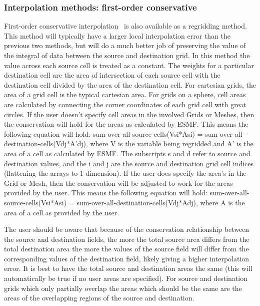 \subsubsection{Interpolation methods: first-order conservative}
 First-order conservative interpolation~\cite{ConservativeOrder1} is also available as a regridding method. This method 
 will typically have  
 a larger local interpolation error than the previous two methods, but will do a much better job of preserving the value
 of the  integral of data between the source and destination grid. In this method the value across each source cell
 is treated as a constant. The weights for a particular destination cell are the area of intersection of each 
 source cell with the destination cell divided by the area of the destination cell. For cartesian grids, the area of a grid cell is the typical cartesian area. 
 For grids on a sphere, cell areas are calculated by connecting the corner coordinates of each grid cell with great circles. If the user doesn't specify
 cell areas in the involved Grids or Meshes, then the conservation will hold for the areas as calculated by 
 ESMF. This means the following equation will hold:  sum-over-all-source-cells(Vsi*Asi) = sum-over-all-destination-cells(Vdj*A'dj), where
 V is the variable being regridded and A' is the area of a cell as calculated by ESMF.  The subscripts s and d refer to source and destination values, and the i and j are the source 
 and destination grid cell indices (flattening the arrays to 1 dimension). If the user does specify the area's in the Grid or Mesh, then the conservation will be adjusted to work for the areas 
 provided by the user. This means the following equation will hold:  sum-over-all-source-cells(Vsi*Asi) = sum-over-all-destination-cells(Vdj*Adj),
 where A is the area of a cell as provided by the user. 

 The user should be aware that because of the conservation relationship between the source and destination fields, the more the total source area
 differs from the total destination area the more the values of the source field will differ from the corresponding values of the destination field, likely giving a higher 
 interpolation error. It is best to have the total source and destination areas the same (this will automatically be true if no user areas are specified). For source and destination grids 
 which only partially overlap the areas which should be the same are the areas of the overlapping regions of the source and destination. 


